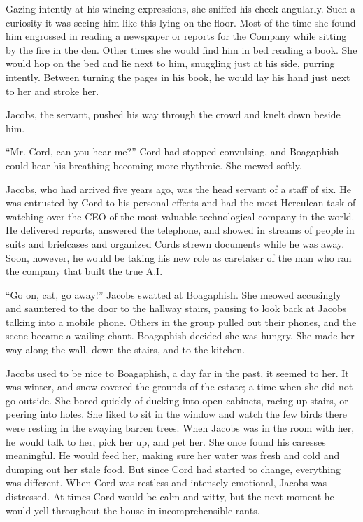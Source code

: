 Gazing intently at his wincing expressions, she sniffed his cheek
angularly. Such a curiosity it was seeing him like this lying on the
floor. Most of the time she found him engrossed in reading a newspaper
or reports for the Company while sitting by the fire in the den. Other
times she would find him in bed reading a book. She would hop on the bed
and lie next to him, snuggling just at his side, purring intently.
Between turning the pages in his book, he would lay his hand just next
to her and stroke her.

Jacobs, the servant, pushed his way through the crowd and knelt down
beside him.

``Mr. Cord, can you hear me?'' Cord had stopped convulsing, and
Boagaphish could hear his breathing becoming more rhythmic. She mewed
softly.

Jacobs, who had arrived five years ago, was the head servant of a staff
of six. He was entrusted by Cord to his personal effects and had the
most Herculean task of watching over the CEO of the most valuable
technological company in the world. He delivered reports, answered the
telephone, and showed in streams of people in suits and briefcases and
organized Cord\textquotesingle s strewn documents while he was away.
Soon, however, he would be taking his new role as caretaker of the man
who ran the company that built the true A.I.

``Go on, cat, go away!'' Jacobs swatted at Boagaphish. She meowed
accusingly and sauntered to the door to the hallway stairs, pausing to
look back at Jacobs talking into a mobile phone. Others in the group
pulled out their phones, and the scene became a wailing chant.
Boagaphish decided she was hungry. She made her way along the wall, down
the stairs, and to the kitchen.

Jacobs used to be nice to Boagaphish, a day far in the past, it seemed
to her. It was winter, and snow covered the grounds of the estate; a
time when she did not go outside. She bored quickly of ducking into open
cabinets, racing up stairs, or peering into holes. She liked to sit in
the window and watch the few birds there were resting in the swaying
barren trees. When Jacobs was in the room with her, he would talk to
her, pick her up, and pet her. She once found his caresses meaningful.
He would feed her, making sure her water was fresh and cold and dumping
out her stale food. But since Cord had started to change, everything was
different. When Cord was restless and intensely emotional, Jacobs was
distressed. At times Cord would be calm and witty, but the next moment
he would yell throughout the house in incomprehensible rants.

